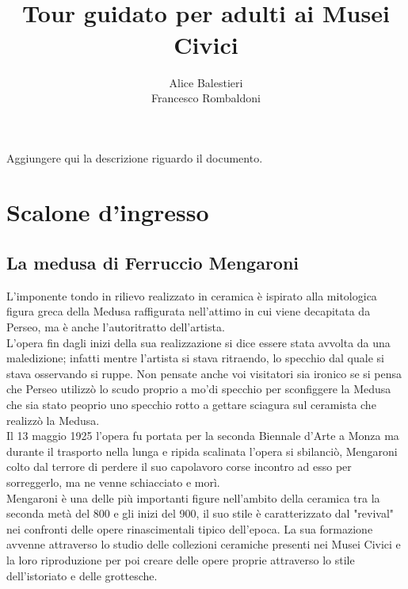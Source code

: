 \documentclass[hidelinks,12pt,a4paper]{article}
\begin{document}
	\begin{flushleft}
	
		\LARGE
	
		\title{\textbf{\\Tour guidato per adulti ai Musei Civici}}
		\author{Alice Balestieri\\Francesco Rombaldoni}
		\date{}
		
		\maketitle
		
		\setcounter{page}{1}
		\newpage
		\vspace*{\fill}
		Aggiungere qui la descrizione riguardo il documento. 
		\vspace*{\fill}
		\newpage
		\tableofcontents
		\newpage
		
		\section{Scalone d'ingresso}
		
		\subsection{La medusa di Ferruccio Mengaroni}
		L'imponente tondo in rilievo realizzato in ceramica è ispirato alla mitologica figura greca della Medusa raffigurata nell'attimo in cui viene decapitata da Perseo, ma è anche l’autoritratto dell'artista.\\
		L'opera fin dagli inizi della sua realizzazione si dice essere stata avvolta da una maledizione; infatti mentre l'artista si stava ritraendo, lo specchio dal quale si stava osservando si ruppe. Non pensate anche voi visitatori sia ironico se si pensa che Perseo utilizzò lo scudo proprio a mo'di specchio per sconfiggere la Medusa che sia stato peoprio uno specchio rotto a gettare sciagura sul ceramista che realizzò la Medusa.\\
		Il 13 maggio 1925 l'opera fu portata per la seconda Biennale d'Arte a Monza ma durante il trasporto nella lunga e ripida scalinata l'opera si sbilanciò, Mengaroni colto dal terrore di perdere il suo capolavoro corse incontro ad esso per sorreggerlo, ma ne venne schiacciato e morì.\\
		Mengaroni è una delle più importanti figure nell'ambito della ceramica tra la seconda metà del 800 e gli inizi del 900, il suo stile è caratterizzato dal "revival" nei confronti delle opere rinascimentali tipico dell'epoca. La sua formazione avvenne attraverso lo studio delle collezioni ceramiche presenti nei Musei Civici e la loro riproduzione per poi creare delle opere proprie attraverso lo stile dell'istoriato e delle grottesche.
		

\end{flushleft}
\end{document}
